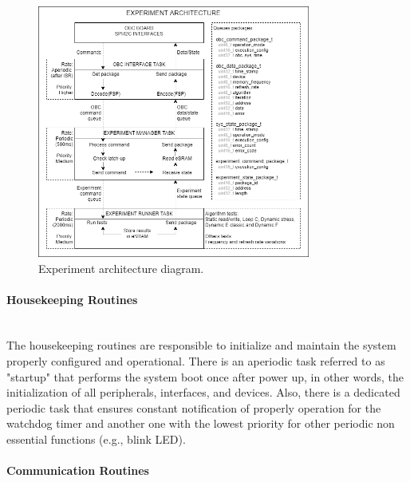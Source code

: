 \begin{figure}[!ht]
    \begin{center}
        \includegraphics[width=0.8\textwidth]{figures/experiment_architecture.png}
        \caption{Experiment architecture diagram.}
        \label{fig:experiment_architecture}
    \end{center}
\end{figure}

\paragraph{Housekeeping Routines} \mbox{}\\

The housekeeping routines are responsible to initialize and maintain the system properly configured and operational. There is an aperiodic task referred to as "startup" that performs the system boot once after power up, in other words, the initialization of all peripherals, interfaces, and devices. Also, there is a dedicated periodic task that ensures constant notification of properly operation for the watchdog timer and another one with the lowest priority for other periodic non essential functions (e.g., blink LED).

\paragraph{Communication Routines} \mbox{}\\

